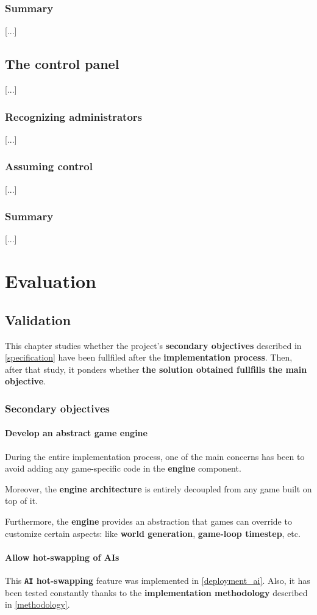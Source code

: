 \documentclass[a4paper,11pt,titlepage,abstract,numbers=noenddot,automark,mnsy,intlimits,rgb,dvipsnames]{report}
\begin{document}
\section{Summary}
[...]
\chapter{The control panel}
\label{control_panel}
[...]
\section{Recognizing administrators}
[...]
\section{Assuming control}
[...]
\section{Summary}
[...]
\part{Evaluation}
\chapter{Validation}
\label{validation}
This chapter studies whether the project's \textbf{secondary objectives} described in \autoref{specification}
have been fullfiled after the \textbf{implementation process}. Then, after that study, it ponders whether
\textbf{the solution obtained fullfills the main objective}.
\section{Secondary objectives}
\subsection{Develop an abstract game engine}
During the entire implementation process, one of the main concerns has been to avoid adding any game-specific code
in the \textbf{engine} component.

Moreover, the \textbf{engine architecture} is entirely decoupled from any game built on
top of it.

Furthermore, the \textbf{engine} provides an abstraction that games can override to customize certain aspects:
like \textbf{world generation}, \textbf{game-loop timestep}, etc.
\subsection{Allow hot-swapping of AIs}
This \textbf{\texttt{AI} hot-swapping} feature was implemented in \autoref{deployment_ai}. Also, it has been tested constantly
thanks to the \textbf{implementation methodology} described in \autoref{methodology}.
\end{document}
